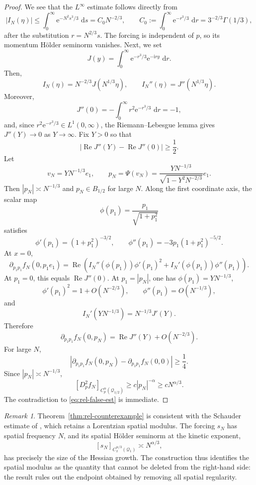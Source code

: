 \documentclass[11pt,reqno]{amsart}
\numberwithin{equation}{section}
\theoremstyle{remark}
\newtheorem{remark}[theorem]{Remark}
\newcommand{\ii}{\mathrm{i}}
\newcommand{\e}{\mathrm{e}}
\newcommand{\dd}{\,\mathrm{d}}
\newcommand{\abs}[1]{\left|#1\right|}
\begin{document}
\begin{proof}
We see that the $L^\infty$ estimate follows directly from
\[
   |I_N(\eta)|\le\int_0^\infty\e^{-N^2s^3/3}\,\dd s
   =C_0N^{-2/3},
   \qquad
   C_0:=\int_0^\infty\e^{-r^3/3}\,\dd r=3^{-2/3}\Gamma(1/3),
\]
after the substitution $r=N^{2/3}s$.
The forcing is independent of $p$, so its momentum H\"older seminorm vanishes. Next, we set
\[
   J(y)=\int_0^\infty\e^{-r^3/3}\e^{-\ii ry}\,\dd r.
\]
Then,
\[
   I_N(\eta)=N^{-2/3}J(N^{1/3}\eta),
   \qquad
   I_N''(\eta)=J''(N^{1/3}\eta).
\]
Moreover,
\[
   J''(0)=-\int_0^\infty r^2\e^{-r^3/3}\,\dd r=-1,
\]
and, since $r^2\e^{-r^3/3}\in L^1(0,\infty)$, the Riemann--Lebesgue lemma gives $J''(Y)\to0$ as $Y\to\infty$.  Fix $Y>0$ so that
\[
   \abs{\operatorname{Re}J''(Y)-\operatorname{Re}J''(0)}\ge\frac12.
\]
Let
\[
   v_N=YN^{-1/3}e_1,
   \qquad
   p_N=\Psi(v_N)=\frac{YN^{-1/3}}{\sqrt{1-Y^2N^{-2/3}}}e_1.
\]
Then $|p_N|\asymp N^{-1/3}$ and $p_N\in B_{1/2}$ for large $N$. Along the first coordinate axis, the scalar map
\[
   \phi(p_1)=\frac{p_1}{\sqrt{1+p_1^2}}
\]
satisfies
\[
   \phi'(p_1)=(1+p_1^2)^{-3/2},
   \qquad
   \phi''(p_1)=-3p_1(1+p_1^2)^{-5/2}.
\]
At $x=0$,
\[
   \partial_{p_1p_1}f_N(0,p_1e_1)
   =\operatorname{Re}\!\left(
      I_N''(\phi(p_1))\phi'(p_1)^2
      +I_N'(\phi(p_1))\phi''(p_1)
   \right).
\]
At $p_1=0$, this equals $\operatorname{Re}J''(0)$.  At $p_1=|p_N|$, one has $\phi(p_1)=YN^{-1/3}$,
\[
   \phi'(p_1)^2=1+O(N^{-2/3}),
   \qquad
   \phi''(p_1)=O(N^{-1/3}),
\]
and
\[
   I_N'(YN^{-1/3})=N^{-1/3}J'(Y).
\]
Therefore
\[
   \partial_{p_1p_1}f_N(0,p_N)
   =\operatorname{Re}J''(Y)+O(N^{-2/3}).
\]
For large $N$,
\[
   \abs{\partial_{p_1p_1}f_N(0,p_N)-\partial_{p_1p_1}f_N(0,0)}
   \ge\frac14.
\]
Since $|p_N|\asymp N^{-1/3}$,
\[
   [D_p^2f_N]_{C_p^\alpha(\mathcal Q_{1/2})}
   \ge c|p_N|^{-\alpha}
   \ge cN^{\alpha/3}.
\]
The contradiction to \eqref{eq:rel-false-est} is immediate.
\end{proof}

\begin{remark}\label{rem:consistency}
Theorem~\ref{thm:rel-counterexample} is consistent with the Schauder estimate of \cite[Theorem~6.5]{HSTT}, which retains a Lorentzian spatial modulus.  The forcing $s_N$ has spatial frequency $N$, and its spatial H\"older seminorm at the kinetic exponent,
\[
   [s_N]_{C_x^{\alpha/3}(\mathcal Q_1)}\asymp N^{\alpha/3},
\]
has precisely the size of the Hessian growth.  The construction thus identifies the spatial modulus as the quantity that cannot be deleted from the right-hand side: the result rules out the endpoint obtained by removing all spatial regularity.
\end{remark}
\end{document}

